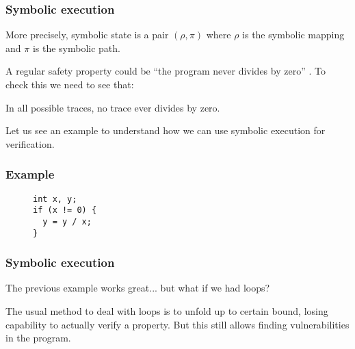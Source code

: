 \documentclass{beamer}
\begin{document}
\begin{frame}
  \frametitle{Symbolic execution}
  More precisely, symbolic state is a pair $(\rho,\pi)$ where $\rho$ is the symbolic mapping and
  $\pi$ is the symbolic path.

  \vspace{1em}
  A regular safety property could be ``the program never divides by zero'' .
  To check this we need to see that:
  \begin{center}
    In all possible traces, no trace ever divides by zero.
  \end{center}

  \vspace{1em}
  Let us see an example to understand how we can use symbolic execution for verification.
\end{frame}

\begin{frame}[fragile]
  \frametitle{Example}
  \begin{figure}[htp]
    \centering
    \begin{verbatim}
int x, y;
if (x != 0) {
  y = y / x;
}
    \end{verbatim}
  \end{figure}
  \begin{figure}
  \end{figure}
\end{frame}

\begin{frame}
  \frametitle{Symbolic execution}
  The previous example works great... \pause but what if we had loops?
  
  \vspace{1em}
  The usual method to deal with loops is to unfold up to certain bound, losing capability to actually
  verify a property.
  But this still allows finding vulnerabilities in the program.
\end{frame}
\end{document}

